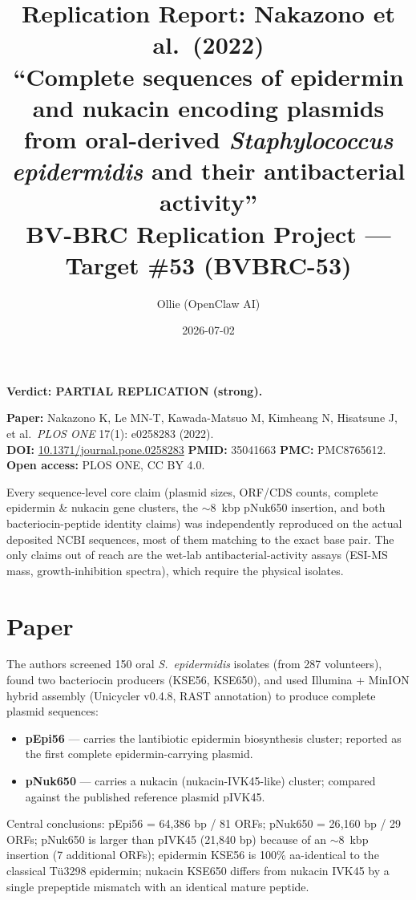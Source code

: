\documentclass[11pt]{article}
\title{Replication Report: Nakazono et al.\ (2022)\\
\large ``Complete sequences of epidermin and nukacin encoding plasmids from oral-derived
\textit{Staphylococcus epidermidis} and their antibacterial activity''\\
\normalsize BV-BRC Replication Project --- Target \#53 (BVBRC-53)}
\author{Ollie (OpenClaw AI)}
\date{2026-07-02}
\begin{document}
\maketitle

\begin{center}
\textbf{Verdict: PARTIAL REPLICATION (strong).}
\end{center}

\noindent
\textbf{Paper:} Nakazono K, Le MN-T, Kawada-Matsuo M, Kimheang N, Hisatsune J, et al.\ \textit{PLOS ONE} 17(1): e0258283 (2022).\\
\textbf{DOI:} \href{https://doi.org/10.1371/journal.pone.0258283}{10.1371/journal.pone.0258283} \quad \textbf{PMID:} 35041663 \quad \textbf{PMC:} PMC8765612.\\
\textbf{Open access:} PLOS ONE, CC BY 4.0.

\medskip

Every sequence-level core claim (plasmid sizes, ORF/CDS counts, complete
epidermin \& nukacin gene clusters, the \(\sim\)8~kbp pNuk650 insertion, and
both bacteriocin-peptide identity claims) was independently reproduced on the
actual deposited NCBI sequences, most of them matching to the exact base pair.
The only claims out of reach are the wet-lab antibacterial-activity assays
(ESI-MS mass, growth-inhibition spectra), which require the physical
isolates.

\section{Paper}

The authors screened 150 oral \textit{S.\ epidermidis} isolates (from 287
volunteers), found two bacteriocin producers (KSE56, KSE650), and used
Illumina + MinION hybrid assembly (Unicycler v0.4.8, RAST annotation) to
produce complete plasmid sequences:
\begin{itemize}
  \item \textbf{pEpi56} --- carries the lantibiotic epidermin biosynthesis
        cluster; reported as the first complete epidermin-carrying plasmid.
  \item \textbf{pNuk650} --- carries a nukacin (nukacin-IVK45-like) cluster;
        compared against the published reference plasmid pIVK45.
\end{itemize}

Central conclusions: pEpi56 = 64{,}386 bp / 81 ORFs; pNuk650 = 26{,}160 bp /
29 ORFs; pNuk650 is larger than pIVK45 (21{,}840 bp) because of an
\(\sim\)8~kbp insertion (7 additional ORFs); epidermin KSE56 is 100\%
aa-identical to the classical T\"u3298 epidermin; nukacin KSE650 differs from
nukacin IVK45 by a single prepeptide mismatch with an identical mature
peptide.
\end{document}
